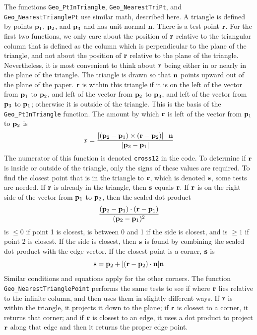 \documentclass[11pt]{article}
\newcommand {\ttt} {\texttt}
\begin{document}
\begin{description}
The functions \ttt{Geo\_PtInTriangle}, \ttt{Geo\_NearestTriPt}, and \ttt{Geo\_NearestTrianglePt} use similar math, described here. A triangle is defined by points $\vb{p}_1$, $\vb{p}_2$, and $\vb{p}_3$ and has unit normal $\vb{n}$. There is a test point $\vb{r}$. For the first two functions, we only care about the position of $\vb{r}$ relative to the triangular column that is defined as the column which is perpendicular to the plane of the triangle, and not about the position of $\vb{r}$ relative to the plane of the triangle. Nevertheless, it is most convenient to think about $\vb{r}$ being either in or nearly in the plane of the triangle. The triangle is drawn so that $\vb{n}$ points upward out of the plane of the paper. $\vb{r}$ is within this triangle if it is on the left of the vector from $\vb{p}_1$ to $\vb{p}_2$, and left of the vector from $\vb{p}_2$ to $\vb{p}_3$, and left of the vector from $\vb{p}_3$ to $\vb{p}_1$; otherwise it is outside of the triangle. This is the basis of the \ttt{Geo\_PtInTriangle} function. The amount by which $\vb{r}$ is left of the vector from $\vb{p}_1$ to $\vb{p}_2$ is
$$x=\frac{[(\vb{p}_2-\vb{p}_1)\times(\vb{r}-\vb{p}_2)]\cdot \vb{n}}{|\vb{p}_2-\vb{p}_1|}$$
The numerator of this function is denoted \ttt{cross12} in the code. To determine if $\vb{r}$ is inside or outside of the triangle, only the signs of these values are required. To find the closest point that is in the triangle to $\vb{r}$, which is denoted $\vb{s}$, some tests are needed. If $\vb{r}$ is already in the triangle, then $\vb{s}$ equals $\vb{r}$. If $\vb{r}$ is on the right side of the vector from $\vb{p}_1$ to $\vb{p}_2$, then the scaled dot product
$$\frac{(\vb{p}_2-\vb{p}_1)\cdot(\vb{r}-\vb{p}_1)}{(\vb{p}_2-\vb{p}_1)^2}$$
is $\leq 0$ if point 1 is closest, is between 0 and 1 if the side is closest, and is $\geq 1$ if point 2 is closest. If the side is closest, then $\vb{s}$ is found by combining the scaled dot product with the edge vector. If the closest point is a corner, $\vb{s}$ is
$$\vb{s} = \vb{p}_2 + [(\vb{r}-\vb{p}_2)\cdot \vb{n}]\vb{n}$$
Similar conditions and equations apply for the other corners. The function \ttt{Geo\_NearestTrianglePoint} performs the same tests to see if where $\vb{r}$ lies relative to the infinite column, and then uses them in slightly different ways. If $\vb{r}$ is within the triangle, it projects it down to the plane; if $\vb{r}$ is closest to a corner, it returns that corner; and if $\vb{r}$ is closest to an edge, it uses a dot product to project $\vb{r}$ along that edge and then it returns the proper edge point.


\end{description}
\end{document}
